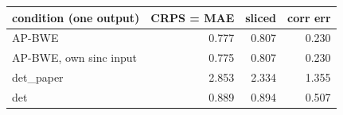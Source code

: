 \begin{tabular}{lrrr}
\toprule
condition (one output) & CRPS = MAE & sliced & corr err \\
\midrule
AP-BWE & 0.777 & 0.807 & 0.230 \\
AP-BWE, own sinc input & 0.775 & 0.807 & 0.230 \\
det\_paper & 2.853 & 2.334 & 1.355 \\
det & 0.889 & 0.894 & 0.507 \\
\bottomrule
\end{tabular}
